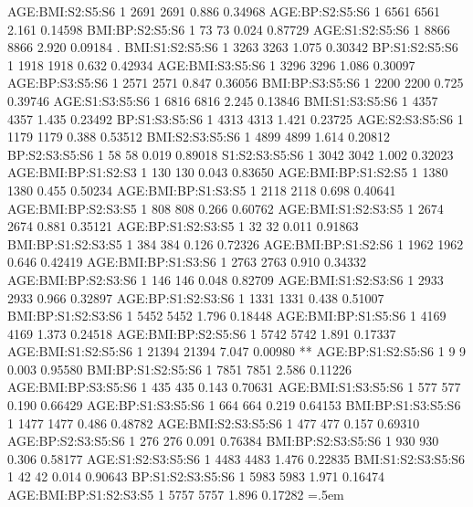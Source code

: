 \documentclass[runningheads]{llncs}
\newenvironment{lcverbatim}
 {\SaveVerbatim{cverb}}
 {\endSaveVerbatim
  \flushleft\fboxrule=0pt\fboxsep=.5em
  \colorbox{cverbbg}{%
    \makebox[\dimexpr\linewidth-2\fboxsep][l]{\BUseVerbatim{cverb}}%
  }
  \endflushleft
}
\begin{document}
\begin{lcverbatim}
AGE:BMI:S2:S5:S6        1   2691    2691   0.886  0.34968    
AGE:BP:S2:S5:S6         1   6561    6561   2.161  0.14598    
BMI:BP:S2:S5:S6         1     73      73   0.024  0.87729    
AGE:S1:S2:S5:S6         1   8866    8866   2.920  0.09184 .  
BMI:S1:S2:S5:S6         1   3263    3263   1.075  0.30342    
BP:S1:S2:S5:S6          1   1918    1918   0.632  0.42934    
AGE:BMI:S3:S5:S6        1   3296    3296   1.086  0.30097    
AGE:BP:S3:S5:S6         1   2571    2571   0.847  0.36056    
BMI:BP:S3:S5:S6         1   2200    2200   0.725  0.39746    
AGE:S1:S3:S5:S6         1   6816    6816   2.245  0.13846    
BMI:S1:S3:S5:S6         1   4357    4357   1.435  0.23492    
BP:S1:S3:S5:S6          1   4313    4313   1.421  0.23725    
AGE:S2:S3:S5:S6         1   1179    1179   0.388  0.53512    
BMI:S2:S3:S5:S6         1   4899    4899   1.614  0.20812    
BP:S2:S3:S5:S6          1     58      58   0.019  0.89018    
S1:S2:S3:S5:S6          1   3042    3042   1.002  0.32023    
AGE:BMI:BP:S1:S2:S3     1    130     130   0.043  0.83650    
AGE:BMI:BP:S1:S2:S5     1   1380    1380   0.455  0.50234    
AGE:BMI:BP:S1:S3:S5     1   2118    2118   0.698  0.40641    
AGE:BMI:BP:S2:S3:S5     1    808     808   0.266  0.60762    
AGE:BMI:S1:S2:S3:S5     1   2674    2674   0.881  0.35121    
AGE:BP:S1:S2:S3:S5      1     32      32   0.011  0.91863    
BMI:BP:S1:S2:S3:S5      1    384     384   0.126  0.72326    
AGE:BMI:BP:S1:S2:S6     1   1962    1962   0.646  0.42419    
AGE:BMI:BP:S1:S3:S6     1   2763    2763   0.910  0.34332    
AGE:BMI:BP:S2:S3:S6     1    146     146   0.048  0.82709    
AGE:BMI:S1:S2:S3:S6     1   2933    2933   0.966  0.32897    
AGE:BP:S1:S2:S3:S6      1   1331    1331   0.438  0.51007    
BMI:BP:S1:S2:S3:S6      1   5452    5452   1.796  0.18448    
AGE:BMI:BP:S1:S5:S6     1   4169    4169   1.373  0.24518    
AGE:BMI:BP:S2:S5:S6     1   5742    5742   1.891  0.17337    
AGE:BMI:S1:S2:S5:S6     1  21394   21394   7.047  0.00980 ** 
AGE:BP:S1:S2:S5:S6      1      9       9   0.003  0.95580    
BMI:BP:S1:S2:S5:S6      1   7851    7851   2.586  0.11226    
AGE:BMI:BP:S3:S5:S6     1    435     435   0.143  0.70631    
AGE:BMI:S1:S3:S5:S6     1    577     577   0.190  0.66429    
AGE:BP:S1:S3:S5:S6      1    664     664   0.219  0.64153    
BMI:BP:S1:S3:S5:S6      1   1477    1477   0.486  0.48782    
AGE:BMI:S2:S3:S5:S6     1    477     477   0.157  0.69310    
AGE:BP:S2:S3:S5:S6      1    276     276   0.091  0.76384    
BMI:BP:S2:S3:S5:S6      1    930     930   0.306  0.58177    
AGE:S1:S2:S3:S5:S6      1   4483    4483   1.476  0.22835    
BMI:S1:S2:S3:S5:S6      1     42      42   0.014  0.90643    
BP:S1:S2:S3:S5:S6       1   5983    5983   1.971  0.16474    
AGE:BMI:BP:S1:S2:S3:S5  1   5757    5757   1.896  0.17282    
\end{lcverbatim}
\end{document}
